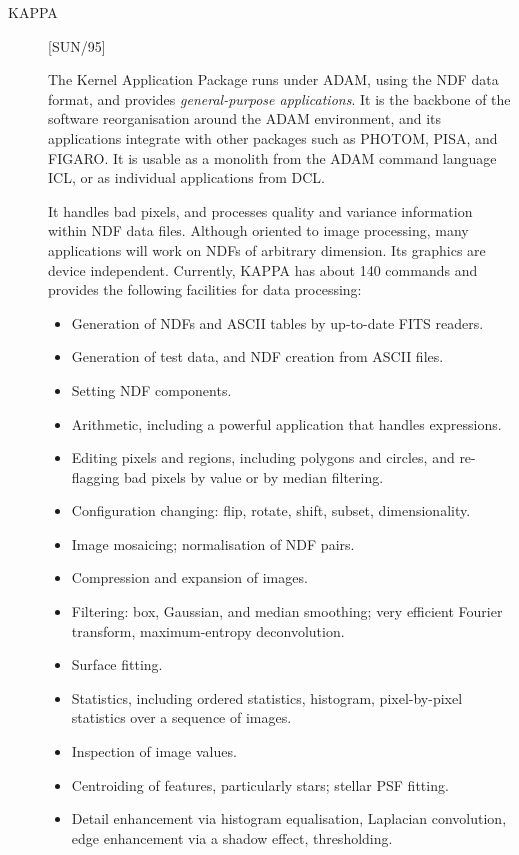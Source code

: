 \begin{description}

\item [KAPPA] \hfill [SUN/95]

The Kernel Application Package runs under ADAM, using the NDF data format, and
provides {\em general-purpose applications}.
It is the backbone of the software reorganisation around the ADAM environment,
and its applications integrate with other packages such as PHOTOM, PISA, and
FIGARO.
It is usable as a monolith from the ADAM command language ICL, or as individual
applications from DCL.

It handles bad pixels, and processes quality and variance information within
NDF data files.
Although oriented to image processing, many applications will work on NDFs of
arbitrary dimension.
Its graphics are device independent.
Currently, KAPPA has about 140 commands and provides the following facilities
for data processing:
\begin{itemize}
\item Generation of NDFs and ASCII tables by up-to-date FITS readers.
\item Generation of test data, and NDF creation from ASCII files.
\item Setting NDF components.
\item Arithmetic, including a powerful application that handles expressions.
\item Editing pixels and regions, including polygons and circles, and
 re-flagging bad pixels by value or by median filtering.
\item Configuration changing: flip, rotate, shift, subset, dimensionality.
\item Image mosaicing; normalisation of NDF pairs.
\item Compression and expansion of images.
\item Filtering: box, Gaussian, and median smoothing; very efficient Fourier
 transform, maximum-entropy deconvolution.
\item Surface fitting.
\item Statistics, including ordered statistics, histogram, pixel-by-pixel
 statistics over a sequence of images.
\item Inspection of image values.
\item Centroiding of features, particularly stars; stellar PSF fitting.
\item Detail enhancement via histogram equalisation, Laplacian convolution,
 edge enhancement via a shadow effect, thresholding.
\end{itemize}


\end{description}
